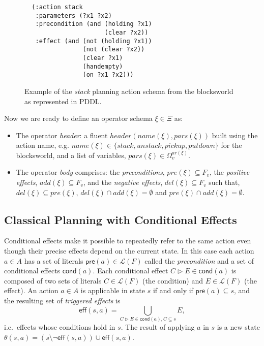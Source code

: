 \documentclass[letterpaper]{article} %
\newcommand{\pre}{\mathsf{pre}}     %
\newcommand{\eff}{\mathsf{eff}}     %
\newcommand{\cond}{\mathsf{cond}}   %
\begin{document}
\begin{figure}[hbt]
\begin{footnotesize}
\begin{verbatim}
  (:action stack
   :parameters (?x1 ?x2)
   :precondition (and (holding ?x1) 
                      (clear ?x2))
   :effect (and (not (holding ?x1))
                (not (clear ?x2))
                (clear ?x1)
                (handempty)
                (on ?x1 ?x2)))
\end{verbatim}
\end{footnotesize}
 \caption{\small Example of the {\em stack} planning action schema from the blocksworld as represented in PDDL.}
\label{fig:stack}
\end{figure}

Now we are ready to define an operator schema $\xi\in \Xi$ as:
\begin{itemize}
\item The operator {\em header}: a fluent $header(name(\xi),pars(\xi))$ built using the action name, e.g. $name(\xi)\in\{stack,unstack,pickup,putdown\}$ for the blocksworld, and a list of variables, $pars(\xi)\in\Omega_v^{ar(\xi)}$. 
\item The operator {\em body} comprises: the {\em preconditions}, $pre(\xi)\subseteq F_v$, the {\em positive effects}, $add(\xi)\subseteq F_v$, and the {\em negative effects}, $del(\xi)\subseteq F_v$ such that, $del(\xi)\subseteq pre(\xi)$, $del(\xi)\cap add(\xi)=\emptyset$ and $pre(\xi)\cap add(\xi)=\emptyset$.
\end{itemize}


\subsection{Classical Planning with Conditional Effects}
Conditional effects make it possible to repeatedly refer to the same action even though their precise effects depend on the current state. In this case each action $a\in A$ has a set of literals $\pre(a)\in\mathcal{L}(F)$ called the {\em precondition} and a set of conditional effects $\cond(a)$. Each conditional effect $C\rhd E\in\cond(a)$ is composed of two sets of literals $C\in\mathcal{L}(F)$ (the condition) and $E\in\mathcal{L}(F)$ (the effect). An action $a\in A$ is applicable in state $s$ if and only if $\pre(a)\subseteq s$, and the resulting set of {\em triggered effects} is
\[
\eff(s,a)=\bigcup_{C\rhd E\in\cond(a),C\subseteq s} E,
\]
i.e.~effects whose conditions hold in $s$. The result of applying $a$ in $s$ is a new state $\theta(s,a)=(s\setminus \neg\eff(s,a))\cup\eff(s,a)$.
\end{document}
